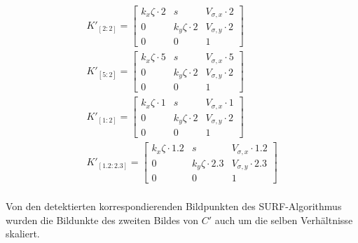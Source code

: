 \begin{gather*}
K'_{[2:2]}=	
\begin{bmatrix}
k_x\zeta \cdot 2 &s&V_{\sigma,x} \cdot 2\\
0&k_y\zeta \cdot 2&V_{\sigma,y} \cdot 2\\
0&0&1
\end{bmatrix}\\
K'_{[5:2]}=	
\begin{bmatrix}
k_x\zeta \cdot 5 &s&V_{\sigma,x} \cdot 5\\
0&k_y\zeta \cdot 2&V_{\sigma,y} \cdot 2\\
0&0&1
\end{bmatrix}\\
K'_{[1:2]}=	
\begin{bmatrix}
k_x\zeta \cdot 1 &s&V_{\sigma,x} \cdot 1\\
0&k_y\zeta\cdot 2&V_{\sigma,y} \cdot 2\\
0&0&1
\end{bmatrix}\\
K'_{[1.2:2.3]}=	
\begin{bmatrix}
k_x\zeta \cdot 1.2 &s&V_{\sigma,x} \cdot 1.2\\
0&k_y\zeta \cdot 2.3&V_{\sigma,y} \cdot 2.3\\
0&0&1
\end{bmatrix}\\
\end{gather*}


Von den detektierten korrespondierenden Bildpunkten des SURF-Algorithmus wurden die Bildunkte des zweiten Bildes von $C'$ auch um die selben Verhältnisse skaliert.

